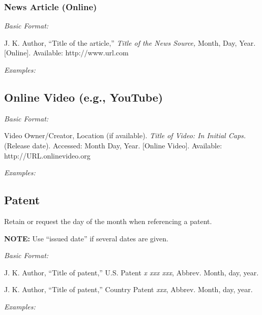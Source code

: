 \documentclass[10pt]{article}
\newcommand*{\guidelabel}[1]{\par\vspace{-4pt}\hspace*{22pt}\textit{#1}\par\vspace{-\parskip}}
\begin{document}
\subsubsection{News Article (Online)}
\guidelabel{Basic Format:}
\begin{guideitems}
  \item J. K. Author, “Title of the article,” \textit{Title of the News Source,} Month, Day, Year. [Online]. Available: http://www.url.com
\end{guideitems}
\guidelabel{Examples:}
\begin{guideitems}
  \item {}
  \item {}
\end{guideitems}

\subsection{Online Video (e.g., YouTube)}
\guidelabel{Basic Format:}
\begin{guideitems}
  \item Video Owner/Creator, Location (if available). \textit{Title of Video: In Initial Caps.} (Release date). Accessed: Month Day, Year. [Online Video]. Available: http://URL.onlinevideo.org
\end{guideitems}
\guidelabel{Examples:}
\begin{guideitems}
  \item {}
  \item {}
\end{guideitems}

\subsection{Patent}

Retain or request the day of the month when referencing a patent.

\textbf{NOTE:} Use “issued date” if several dates are given.

\guidelabel{Basic Format:}
\begin{guideitems}
  \item J. K. Author, “Title of patent,” U.S. Patent \textit{x xxx xxx}, Abbrev. Month, day, year.
  \item J. K. Author, “Title of patent,” Country Patent \textit{xxx}, Abbrev. Month, day, year.
\end{guideitems}
\guidelabel{Examples:}
\begin{guideitems}
  \item {}
  \item {}
  \item {}
  \item {}
  \item {}
\end{guideitems}
\end{document}
